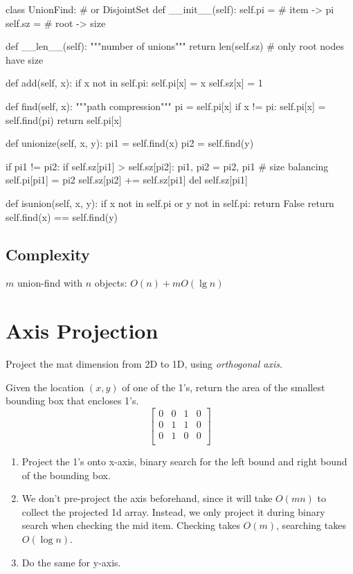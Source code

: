 \begin{python}
class UnionFind:  # or DisjointSet
  def __init__(self):
    self.pi = {}  # item -> pi
    self.sz = {}  # root -> size

  def __len__(self):
    """number of unions"""
    return len(self.sz)  # only root nodes have size

  def add(self, x):
    if x not in self.pi:
      self.pi[x] = x
      self.sz[x] = 1

  def find(self, x):
    """path compression"""
    pi = self.pi[x]
    if x != pi:
      self.pi[x] = self.find(pi)
    return self.pi[x]

  def unionize(self, x, y):
    pi1 = self.find(x)
    pi2 = self.find(y)

    if pi1 != pi2:
      if self.sz[pi1] > self.sz[pi2]:
        pi1, pi2 = pi2, pi1
        # size balancing
      self.pi[pi1] = pi2
      self.sz[pi2] += self.sz[pi1]
      del self.sz[pi1]

  def isunion(self, x, y):
    if x not in self.pi or y not in self.pi:
      return False
    return self.find(x) == self.find(y)
\end{python}

\subsection{Complexity}
$m$ union-find with $n$ objects: $O(n)+m O(\lg n)$

\section{Axis Projection}
Project the mat dimension from 2D to 1D, using \textit{orthogonal axis}.

 Given the location $(x, y)$ of one of the 1's, return the area of the smallest bounding box that encloses 1's.
$$
\begin{bmatrix}
0& 0& 1& 0 \\
0& 1& 1& 0 \\
0& 1& 0& 0 \\
\end{bmatrix}
$$

\begin{enumerate}
\item Project the 1's onto x-axis, binary search for the left bound and right bound of the bounding box. 
\item We don't pre-project the axis beforehand, since it will take $O(mn)$ to collect the projected 1d array. Instead, we only project it during binary search when checking the mid item. Checking takes $O(m)$, searching takes $O(\log n)$. 
\item Do the same for y-axis.
\end{enumerate}

